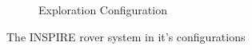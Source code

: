 \begin{figure}[htb]
\begin{subfigure}[b]{0.49\textwidth}
         \caption{Exploration Configuration}
         \label{fig:EndExplorationConfig}
     \end{subfigure}
     \caption{The INSPIRE rover system in it's configurations}
     \label{fig:EndConfig}
\end{figure}

\clearpage